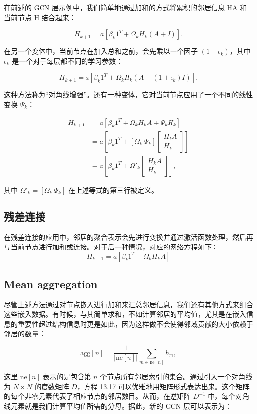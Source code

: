 在前述的 GCN 层示例中，我们简单地通过加和的方式将累积的邻居信息 HA 和当前节点 H 结合起来：

\[
H_{k+1} = a \left[ \beta_k 1^T + \Omega_k H_k (A + I) \right]. \tag{13.13}
\]

在另一个变体中，当前节点在加入总和之前，会先乘以一个因子 \((1 + \epsilon_k)\)，其中 \(\epsilon_k\) 是一个对于每层都不同的学习参数：

\[
H_{k+1} = a \left[ \beta_{k} 1^T + \Omega_k H_k (A + (1 + \epsilon_k)I) \right]. \tag{13.14}
\]

这种方法称为“对角线增强”。还有一种变体，它对当前节点应用了一个不同的线性变换 \(\Psi_k\)：


\begin{align}
H_{k+1} &= a \left[ \beta_{k} 1^T + \Omega_k H_k A + \Psi_k H_k \right] \\
&= a \left[ \beta_{k} 1^T + \left[ \Omega_k \ \Psi_k \right] \begin{bmatrix} H_k A \\ H_k \end{bmatrix} \right] \\
&= a \left[ \beta_{k} 1^T + \Omega'_k \begin{bmatrix} H_k A \\ H_k \end{bmatrix} \right], \tag{13.15}
\end{align} 


其中 \(\Omega'_k = \left[ \Omega_k \ \Psi_k \right]\) 在上述等式的第三行被定义。

\subsection{残差连接}
在残差连接的应用中，邻居的聚合表示会先进行变换并通过激活函数处理，然后再与当前节点进行加和或连接。对于后一种情况，对应的网络方程如下：
\[
H_{k+1} = a \left[ \beta_k 1^T + \Omega_k H_k A \right] \tag{13.16}
\]
\subsection{Mean aggregation}
尽管上述方法通过对节点嵌入进行加和来汇总邻居信息，我们还有其他方式来组合这些嵌入数据。有时候，与其简单求和，不如计算邻居的平均值，尤其是在嵌入信息的重要性超过结构信息时更是如此，因为这样做不会使得邻域贡献的大小依赖于邻居的数量：

\[
\text{agg}[n] = \frac{1}{|\text{ne}[n]|} \sum_{m \in \text{ne}[n]} h_m, \tag{13.17}
\]

这里 \(\text{ne}[n]\) 表示的是包含第 \(n\) 个节点所有邻居索引的集合。通过引入一个对角线为 \(N \times N\) 的度数矩阵 \(D\)，方程 13.17 可以优雅地用矩阵形式表达出来。这个矩阵的每个非零元素代表了相应节点的邻居数目。从而，在逆矩阵 \(D^{-1}\) 中，每个对角线元素就是我们计算平均值所需的分母。据此，新的 GCN 层可以表示为：

